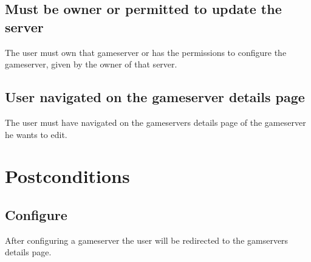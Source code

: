 \documentclass[a4paper,12pt,chapterprefix=false,bibliography=totoc,listof=totoc,]{scrreprt}
\begin{document}
\section{Must be owner or permitted to update the server}
The user must own that gameserver or has the permissions to configure the gameserver, given by the owner of that server.

\section{User navigated on the gameserver details page}
The user must have navigated on the gameservers details page of the gameserver he wants to edit.

\chapter{Postconditions}

\section{Configure}
After configuring a gameserver the user will be redirected to the gamservers details page.
\end{document}
